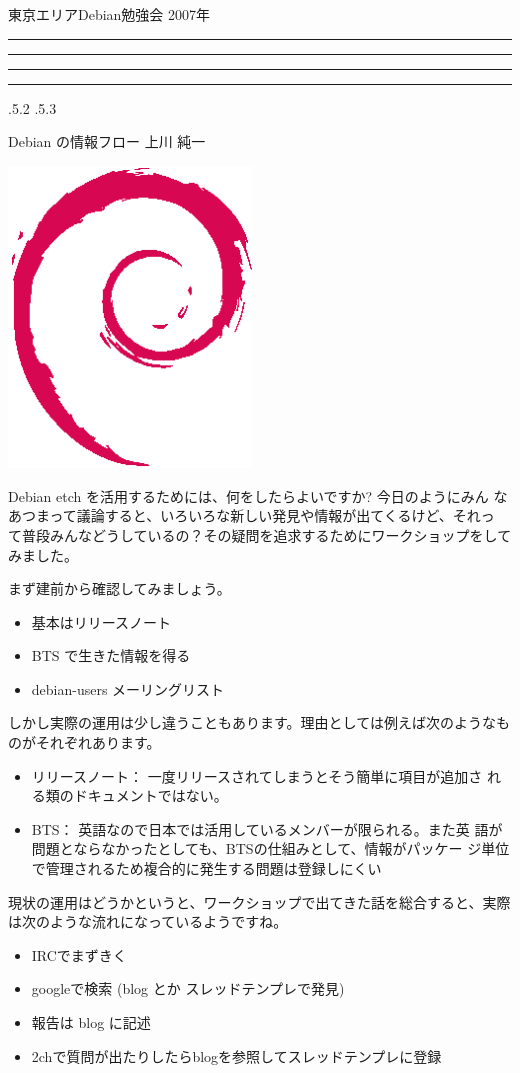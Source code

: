 \documentclass[mingoth,a4paper]{jsarticle}
\makeatletter
\newcommand{\debmtgyear}{2007}
\renewcommand{\section}{\@startsection{section}{1}{\z@}%
    {\Cvs \@plus.5\Cdp \@minus.2\Cdp}%
    {.5\Cvs \@plus.3\Cdp}%
    {\normalfont\Huge\headfont\raggedright\centering}} %
\newcommand{\dancersection}[2]{%
\newpage
東京エリアDebian勉強会 \debmtgyear{}年
\hrule
\vspace{0.5mm}
\hrule
%
\vspace{4cm}
\hrule
\vspace{0.5mm}
\hrule
%
\vspace{-7cm}
\begin{minipage}[b]{0.7\hsize}
\section{#1}
\hfill{}#2\\
\vspace{2cm}
\end{minipage}
\begin{minipage}[b]{0.3\hsize}
\hfill{}\includegraphics[height=8cm]{image200502/openlogo-nd.eps}\\
\end{minipage}
%
\vspace{-1cm}
}
\makeatother
\begin{document}
\dancersection{Debian の情報フロー}{上川 純一}
\label{debianinfo}

\begin{minipage}{0.6\hsize}
 Debian etch を活用するためには、何をしたらよいですか?  今日のようにみん
 なあつまって議論すると、いろいろな新しい発見や情報が出てくるけど、それっ
 て普段みんなどうしているの？その疑問を追求するためにワークショップをして
 みました。

 まず建前から確認してみましょう。

 \begin{itemize}
  \item 基本はリリースノート
  \item BTS で生きた情報を得る
  \item debian-users メーリングリスト
 \end{itemize}

しかし実際の運用は少し違うこともあります。理由としては例えば次のようなも
 のがそれぞれあります。

\begin{itemize}
 \item リリースノート： 一度リリースされてしまうとそう簡単に項目が追加さ
       れる類のドキュメントではない。
 \item BTS： 英語なので日本では活用しているメンバーが限られる。また英
       語が問題とならなかったとしても、BTSの仕組みとして、情報がパッケー 
       ジ単位で管理されるため複合的に発生する問題は登録しにくい
\end{itemize}

現状の運用はどうかというと、ワークショップで出てきた話を総合すると、実際
は次のような流れになっているようですね。

 \begin{itemize}
  \item IRCでまずきく
  \item googleで検索 (blog とか スレッドテンプレで発見)
  \item 報告は blog に記述
  \item 2chで質問が出たりしたらblogを参照してスレッドテンプレに登録
 \end{itemize}
\end{minipage}
\end{document}
